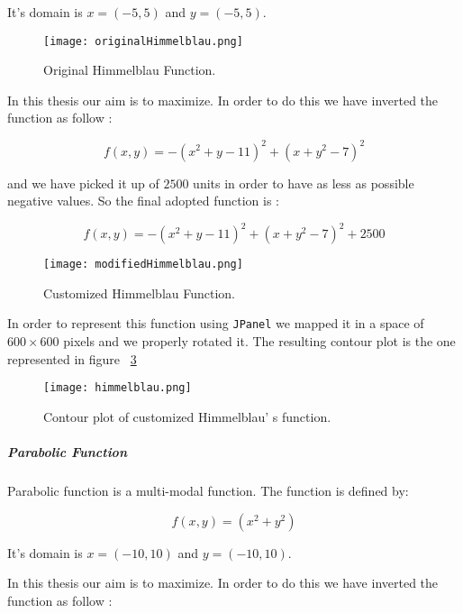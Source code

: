 It's domain is $x = (-5, 5)$ and $y = (-5, 5)$.

\begin{figure}[h!]
	\centering
	\texttt{[image: originalHimmelblau.png]}
	\caption{Original Himmelblau Function.}
	\label{fig:OriginalHimmelblauFunction}
\end{figure}

In this thesis our aim is to maximize. In order to do this we have inverted the function as follow :

\begin{equation}
f(x, y) = -(x^2 + y -11)^2 + (x + y^2 - 7)^2
\end{equation}

and we have picked it up of $2500$ units in order to have as less as possible negative values. So the final adopted function is :
 
\begin{equation}
f(x, y) = -(x^2 + y -11)^2 + (x + y^2 - 7)^2 + 2500
\end{equation}

\begin{figure}[h!]
	\centering
	\texttt{[image: modifiedHimmelblau.png]}
	\caption{Customized Himmelblau Function.}
	\label{fig:CustomizedHimmelblauFunction}
\end{figure}

In order to represent this function using {\tt JPanel} we mapped it in a space of $600 \times 600$ pixels and we properly rotated it. The resulting contour plot is the one represented in figure ~\ref{fig:ContourPlotCustomizedHimmelblauFunction} 

\begin{figure}[h!]
	\centering
	\texttt{[image: himmelblau.png]}
	\caption{Contour plot of customized Himmelblau' s function.}
	\label{fig:ContourPlotCustomizedHimmelblauFunction}
\end{figure}
 
\subparagraph{Parabolic Function} Parabolic function is a multi-modal function. The function is defined by: 

\begin{equation}
f(x, y) = (x^2 + y^2)
\end{equation}

It's domain is $x = (-10, 10)$ and $y = (-10, 10)$.

In this thesis our aim is to maximize. In order to do this we have inverted the function as follow :

